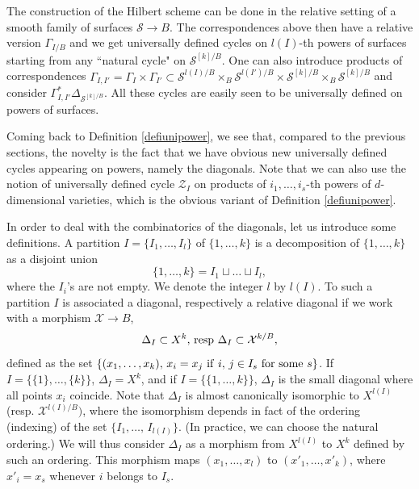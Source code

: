 \documentclass[10pt]{article}
\begin{document}
The construction of the Hilbert scheme can be done in the relative setting of  a smooth family of surfaces
$\mathcal{S}\rightarrow B$.
The correspondences above then have  a relative version
$\Gamma_{I/B}$ and we get
universally defined cycles on $l(I)$-th powers of surfaces starting from any ``natural cycle"
on $\mathcal{S}^{[k]/B}$.  One can also introduce products
of correspondences
$\Gamma_{I,I'}=\Gamma_I\times \Gamma_{I'}\subset \mathcal{S}^{l(I)/B}\times_B \mathcal{S}^{l(I')/B}\times  \mathcal{S}^{[k]/B}\times_B\mathcal{S}^{[k]/B}$
and consider
$\Gamma_{I,I'}^*\Delta_{\mathcal{S}^{[k]/B}}$. All these cycles  are easily seen to be universally defined
on powers of surfaces.

Coming back to Definition \ref{defiunipower}, we see that, compared to the previous sections, the novelty is the fact that we have obvious new  universally defined cycles appearing on powers, namely the diagonals. Note that we can also use  the notion  of  universally defined cycle $\mathcal{Z}_I$ on  products of $i_1,\ldots, i_s$-th powers of $d$-dimensional varieties, which is the obvious variant of Definition \ref{defiunipower}.


    In order to deal with the combinatorics of the diagonals, let us introduce some definitions. A partition
$I=\{I_1,\ldots,I_l\}$ of $\{1,\ldots,k\}$ is a decomposition of $\{1,\ldots,k\}$ as a disjoint union
$$\{1,\ldots,k\}=I_1\sqcup\ldots\sqcup I_l,$$
where the $I_i$'s are not empty. We denote the integer $l$ by $l(I)$. To such a partition $I$ is associated a diagonal, respectively a relative diagonal if we work with a morphism $\mathcal{X}\rightarrow B$,
$$\Delta_I\subset  X^k,\,{\rm resp}\,\,\Delta_I\subset \mathcal{X}^{k/B},$$
defined as the set $\{(x_1,\ldots,x_k),\,x_i=x_j\,\,{\rm if}\,\, i,\,j\in I_s\,\,{\rm for}\,\,{\rm some}\,\,s\}$. If
$I=\{\{1\},\ldots,\{k\}\}$, $\Delta_I=X^k$, and if $I=\{\{{1},\ldots,{k}\}\}$, $\Delta_I$ is the small diagonal where all points $x_i$ coincide.
Note that $\Delta_I$ is almost canonically isomorphic to $X^{l(I)}$ (resp. $\mathcal{X}^{l(I)/B})$, where the isomorphism depends in fact of the ordering (indexing) of the set  $\{I_1,\ldots,\, I_{l(I)}\}$. (In practice, we can choose the natural ordering.)  We will thus consider $\Delta_I$ as a morphism from
$X^{l(I)}$ to $X^k$ defined by such an ordering.  This  morphism maps $(x_1,\ldots,x_l)$ to $(x'_1,\ldots,x'_k)$, where
$x'_i=x_s$ whenever $i$ belongs to $I_s$.
\end{document}
